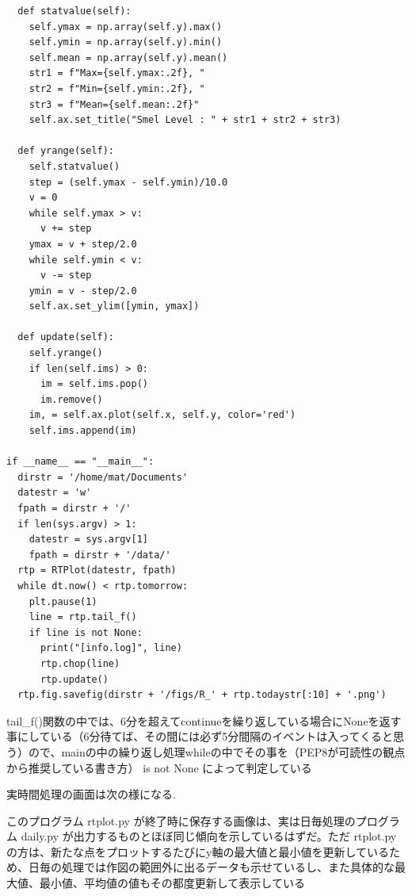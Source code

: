 \documentclass[12pt,a4paper,uplatex]{jsbook}
\begin{document}
\begin{spacing}{0.87}
\begin{breakbox}
\begin{verbatim}
  def statvalue(self):
    self.ymax = np.array(self.y).max()
    self.ymin = np.array(self.y).min()
    self.mean = np.array(self.y).mean()
    str1 = f"Max={self.ymax:.2f}, "
    str2 = f"Min={self.ymin:.2f}, "
    str3 = f"Mean={self.mean:.2f}"
    self.ax.set_title("Smel Level : " + str1 + str2 + str3)

  def yrange(self):
    self.statvalue()
    step = (self.ymax - self.ymin)/10.0
    v = 0
    while self.ymax > v:
      v += step
    ymax = v + step/2.0
    while self.ymin < v:
      v -= step
    ymin = v - step/2.0
    self.ax.set_ylim([ymin, ymax])

  def update(self):
    self.yrange()
    if len(self.ims) > 0:
      im = self.ims.pop()
      im.remove()
    im, = self.ax.plot(self.x, self.y, color='red')
    self.ims.append(im)

if __name__ == "__main__":
  dirstr = '/home/mat/Documents'
  datestr = 'w'
  fpath = dirstr + '/'
  if len(sys.argv) > 1:
    datestr = sys.argv[1]
    fpath = dirstr + '/data/'
  rtp = RTPlot(datestr, fpath)
  while dt.now() < rtp.tomorrow:
    plt.pause(1)
    line = rtp.tail_f()
    if line is not None:
      print("[info.log]", line)
      rtp.chop(line)
      rtp.update()
  rtp.fig.savefig(dirstr + '/figs/R_' + rtp.todaystr[:10] + '.png')
	\end{verbatim}
\end{breakbox}
\end{spacing}

\newpage

tail\_f()関数の中では、6分を超えてcontinueを繰り返している場合にNoneを返す事にしている（6分待てば、その間には必ず5分間隔のイベントは入ってくると思う）ので、mainの中の繰り返し処理whileの中でその事を（PEP8が可読性の観点から推奨している書き方） is not None によって判定している

実時間処理の画面は次の様になる.

このプログラム rtplot.py が終了時に保存する画像は、実は日毎処理のプログラム daily.py が出力するものとほぼ同じ傾向を示しているはずだ。ただ rtplot.py の方は、新たな点をプロットするたびにy軸の最大値と最小値を更新しているため、日毎の処理では作図の範囲外に出るデータも示せているし、また具体的な最大値、最小値、平均値の値もその都度更新して表示している
\end{document}

